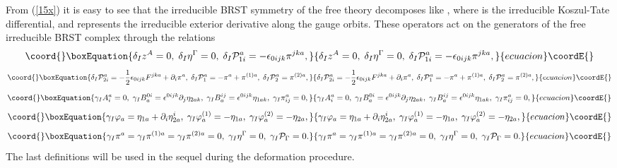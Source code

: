 \documentclass[a4paper,12pt]{article}
\begin{document}
From (\ref{15x}) it is easy to see that the irreducible BRST symmetry \coordHE{} of the free theory
decomposes like \coordHE{}, where \coordHE{} is the
irreducible Koszul-Tate differential, and \coordHE{} represents the
irreducible exterior derivative along the gauge orbits. These operators act
on the generators of the free irreducible BRST complex through the relations 
\begin{equation}\coord{}\boxEquation{
\delta _{I}z^{A}=0,\;\delta _{I}\eta ^{\Gamma }=0,\;\delta _{I}\mathcal{P}
_{1i}^{a}=-\epsilon _{0ijk}\pi ^{jka},  \label{20x}
}{
\delta _{I}z^{A}=0,\;\delta _{I}\eta ^{\Gamma }=0,\;\delta _{I}\mathcal{P}
_{1i}^{a}=-\epsilon _{0ijk}\pi ^{jka},  }{ecuacion}\coordE{}\end{equation}
\begin{equation}\coord{}\boxEquation{
\delta _{I}\mathcal{P}_{2i}^{a}=-\frac{1}{2}\epsilon _{0ijk}F^{jka}+\partial
_{i}\pi ^{a},\;\delta _{I}\mathcal{P}_{1}^{a}=-\pi ^{a}+\pi ^{(1)a},\;\delta
_{I}\mathcal{P}_{2}^{a}=\pi ^{(2)a},  \label{21x}
}{
\delta _{I}\mathcal{P}_{2i}^{a}=-\frac{1}{2}\epsilon _{0ijk}F^{jka}+\partial
_{i}\pi ^{a},\;\delta _{I}\mathcal{P}_{1}^{a}=-\pi ^{a}+\pi ^{(1)a},\;\delta
_{I}\mathcal{P}_{2}^{a}=\pi ^{(2)a},  }{ecuacion}\coordE{}\end{equation}
\begin{equation}\coord{}\boxEquation{
\gamma _{I}A_{i}^{a}=0,\;\gamma _{I}B_{a}^{0i}=\epsilon ^{0ijk}\partial
_{j}\eta _{2ak},\;\gamma _{I}B_{a}^{ij}=\epsilon ^{0ijk}\eta _{1ak},\;\gamma
_{I}\pi _{ij}^{a}=0,  \label{22x}
}{
\gamma _{I}A_{i}^{a}=0,\;\gamma _{I}B_{a}^{0i}=\epsilon ^{0ijk}\partial
_{j}\eta _{2ak},\;\gamma _{I}B_{a}^{ij}=\epsilon ^{0ijk}\eta _{1ak},\;\gamma
_{I}\pi _{ij}^{a}=0,  }{ecuacion}\coordE{}\end{equation}
\begin{equation}\coord{}\boxEquation{
\gamma _{I}\varphi _{a}=\eta _{1a}+\partial _{i}\eta _{2a}^{i},\;\gamma
_{I}\varphi _{a}^{\left( 1\right) }=-\eta _{1a},\;\gamma _{I}\varphi
_{a}^{\left( 2\right) }=-\eta _{2a},  \label{23x}
}{
\gamma _{I}\varphi _{a}=\eta _{1a}+\partial _{i}\eta _{2a}^{i},\;\gamma
_{I}\varphi _{a}^{\left( 1\right) }=-\eta _{1a},\;\gamma _{I}\varphi
_{a}^{\left( 2\right) }=-\eta _{2a},  }{ecuacion}\coordE{}\end{equation}
\begin{equation}\coord{}\boxEquation{
\gamma _{I}\pi ^{a}=\gamma _{I}\pi ^{(1)a}=\gamma _{I}\pi ^{(2)a}=0,\;\gamma
_{I}\eta ^{\Gamma }=0,\;\gamma _{I}\mathcal{P}_{\Gamma }=0.  \label{24x}
}{
\gamma _{I}\pi ^{a}=\gamma _{I}\pi ^{(1)a}=\gamma _{I}\pi ^{(2)a}=0,\;\gamma
_{I}\eta ^{\Gamma }=0,\;\gamma _{I}\mathcal{P}_{\Gamma }=0.  }{ecuacion}\coordE{}\end{equation}
The last definitions will be used in the sequel during the deformation
procedure.
\end{document}
